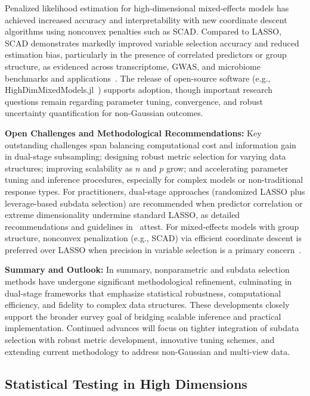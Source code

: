 \documentclass[sigconf]{acmart}
\begin{document}
Penalized likelihood estimation for high-dimensional mixed-effects models has achieved increased accuracy and interpretability with new coordinate descent algorithms using nonconvex penalties such as SCAD. Compared to LASSO, SCAD demonstrates markedly improved variable selection accuracy and reduced estimation bias, particularly in the presence of correlated predictors or group structure, as evidenced across transcriptome, GWAS, and microbiome benchmarks and applications~\cite{ref100}. The release of open-source software (e.g., HighDimMixedModels.jl~\cite{ref100}) supports adoption, though important research questions remain regarding parameter tuning, convergence, and robust uncertainty quantification for non-Gaussian outcomes.

\textbf{Open Challenges and Methodological Recommendations:} Key outstanding challenges span balancing computational cost and information gain in dual-stage subsampling; designing robust metric selection for varying data structures; improving scalability as $n$ and $p$ grow; and accelerating parameter tuning and inference procedures, especially for complex models or non-traditional response types. For practitioners, dual-stage approaches (randomized LASSO plus leverage-based subdata selection) are recommended when predictor correlation or extreme dimensionality undermine standard LASSO, as detailed recommendations and guidelines in~\cite{ref102} attest. For mixed-effects models with group structure, nonconvex penalization (e.g., SCAD) via efficient coordinate descent is preferred over LASSO when precision in variable selection is a primary concern~\cite{ref100}.

\textbf{Summary and Outlook:} In summary, nonparametric and subdata selection methods have undergone significant methodological refinement, culminating in dual-stage frameworks that emphasize statistical robustness, computational efficiency, and fidelity to complex data structures. These developments closely support the broader survey goal of bridging scalable inference and practical implementation. Continued advances will focus on tighter integration of subdata selection with robust metric development, innovative tuning schemes, and extending current methodology to address non-Gaussian and multi-view data.

\subsection{Statistical Testing in High Dimensions}
\end{document}
